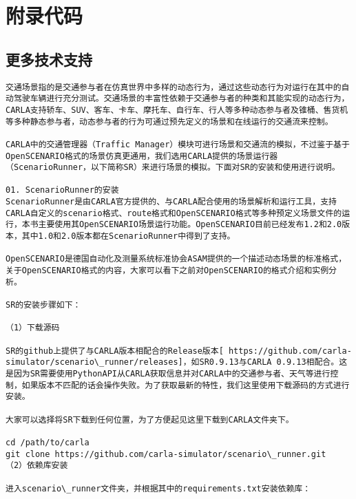 	\chapter{附录代码}


	\section{更多技术支持}
	\begin{lstlisting}
交通场景指的是交通参与者在仿真世界中多样的动态行为，通过这些动态行为对运行在其中的自动驾驶车辆进行充分测试。交通场景的丰富性依赖于交通参与者的种类和其能实现的动态行为，CARLA支持轿车、SUV、客车、卡车、摩托车、自行车、行人等多种动态参与者及锥桶、售货机等多种静态参与者，动态参与者的行为可通过预先定义的场景和在线运行的交通流来控制。
		
CARLA中的交通管理器（Traffic Manager）模块可进行场景和交通流的模拟，不过鉴于基于OpenSCENARIO格式的场景仿真更通用，我们选用CARLA提供的场景运行器（ScenarioRunner，以下简称SR）来进行场景的模拟。下面对SR的安装和使用进行说明。
		
01. ScenarioRunner的安装
ScenarioRunner是由CARLA官方提供的、与CARLA配合使用的场景解析和运行工具，支持CARLA自定义的scenario格式、route格式和OpenSCENARIO格式等多种预定义场景文件的运行，本书主要使用其OpenSCENARIO场景运行功能。OpenSCENARIO目前已经发布1.2和2.0版本，其中1.0和2.0版本都在ScenarioRunner中得到了支持。
		
OpenSCENARIO是德国自动化及测量系统标准协会ASAM提供的一个描述动态场景的标准格式，关于OpenSCENARIO格式的内容，大家可以看下之前对OpenSCENARIO的格式介绍和实例分析。
		
SR的安装步骤如下：
		
（1）下载源码
		
SR的github上提供了与CARLA版本相配合的Release版本[ https://github.com/carla-simulator/scenario\_runner/releases]，如SR0.9.13与CARLA 0.9.13相配合。这是因为SR需要使用PythonAPI从CARLA获取信息并对CARLA中的交通参与者、天气等进行控制，如果版本不匹配的话会操作失败。为了获取最新的特性，我们这里使用下载源码的方式进行安装。
		
大家可以选择将SR下载到任何位置，为了方便起见这里下载到CARLA文件夹下。
		
cd /path/to/carla
git clone https://github.com/carla-simulator/scenario\_runner.git
（2）依赖库安装
		
进入scenario\_runner文件夹，并根据其中的requirements.txt安装依赖库：
		

\end{lstlisting}

